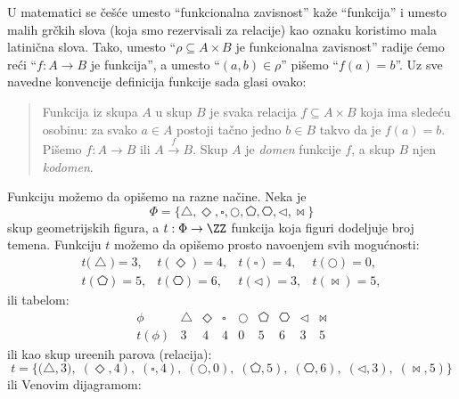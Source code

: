 U matematici se \v ce\v s\'ce umesto ``funkcionalna zavisnost'' ka\v ze ``funkcija'' i umesto malih gr\v ckih
slova (koja smo rezervisali za relacije) kao oznaku koristimo mala latini\v cna slova. Tako, umesto
``$\rho \subseteq A \times B$ je funkcionalna zavisnost'' radije \'cemo re\'ci
``$f : A \to B$ je funkcija'', a umesto ``$(a, b) \in \rho$'' pi\v semo ``$f(a) = b$''.
Uz sve navedne konvencije definicija funkcije sada glasi ovako:

\begin{quote}
  Funkcija iz skupa $A$ u skup $B$ je svaka relacija $f \subseteq A \times B$ koja ima slede\'cu osobinu:
  za svako $a \in A$ postoji ta\v cno jedno $b \in B$ takvo da je $f(a) = b$. Pi\v semo $f : A \to B$
  ili $A \overset{f}{\rightarrow} B$.
  Skup $A$ je \emph{domen} funkcije $f$, a skup $B$ njen \emph{kodomen}.
\end{quote}

\begin{EX}
  Funkciju mo\v zemo da opi\v semo na razne na\v cine. Neka je
  $$
    \Phi = \big\{\bigtriangleup, \Diamond, \square, \bigcirc, \pentagon, \hexagon, \triangleleft, \bowtie\big\}
  $$
  skup geometrijskih figura, a $t : \Phi \to \ZZ$ funkcija koja figuri dodeljuje broj temena.
  Funkciju $t$ mo\v zemo da opi\v semo prosto navo\dj enjem svih mogu\'cnosti:
  $$
    \begin{array}{llll}
      t\big(\bigtriangleup\big) = 3, & t(\Diamond) = 4, & t(\square) = 4, & t(\bigcirc) = 0,\\
      t(\pentagon) = 5, & t(\hexagon) = 6, & t(\triangleleft) = 3, & t(\bowtie) = 5,
    \end{array}
  $$
  ili tabelom:
  $$
    \begin{array}{c|cccccccc}
      \phi    & \bigtriangleup & \Diamond & \square & \bigcirc & \pentagon & \hexagon & \triangleleft & \bowtie\\
      \hline
      t(\phi) &  3             & 4        & 4       & 0        & 5         & 6        & 3             & 5
    \end{array}
  $$
  ili kao skup ure\dj enih parova (relacija):
  $$
    t = \big\{\big(\bigtriangleup, 3\big),\; (\Diamond, 4),\; (\square, 4),\; (\bigcirc, 0),\; (\pentagon, 5),\;
                  (\hexagon, 6),\; (\triangleleft, 3),\; (\bowtie, 5) \big\}
  $$
  ili Venovim dijagramom:
  \begin{center}
    
  \end{center}
\end{EX}

